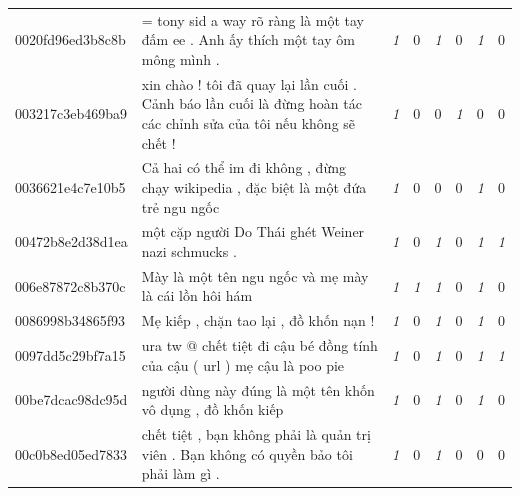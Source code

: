 \begin{table}[htb!]
{\begin{minipage}{0.88\textheight}
\begin{threeparttable}
\begin{tabularx}{\textwidth}{L{0.95} L{6.25} C{0.135} C{0.135} C{0.135} C{0.135} C{0.135} C{0.135}}
                    0020fd96ed3b8c8b & = tony sid a way rõ ràng là một tay đấm ee . Anh ấy thích một tay ôm mông mình .                                                  & \textit{1}  & 0           & \textit{1}  & 0           & \textit{1}  & 0           \\
                    003217c3eb469ba9 & xin chào ! tôi đã quay lại lần cuối . Cảnh báo lần cuối là đừng hoàn tác các chỉnh sửa của tôi nếu không sẽ chết !                & \textit{1}  & 0           & 0           & \textit{1}  & 0           & 0           \\
                    0036621e4c7e10b5 & Cả hai có thể im đi không , đừng chạy wikipedia , đặc biệt là một đứa trẻ ngu ngốc                                                & \textit{1}  & 0           & 0           & 0           & \textit{1}  & 0           \\
                    00472b8e2d38d1ea & một cặp người Do Thái ghét Weiner nazi schmucks .                                                                                 & \textit{1}  & 0           & \textit{1}  & 0           & \textit{1}  & \textit{1}  \\
                    006e87872c8b370c & Mày là một tên ngu ngốc và mẹ mày là cái lồn hôi hám                                                                              & \textit{1}  & \textit{1}  & \textit{1}  & 0           & \textit{1}  & 0           \\
                    0086998b34865f93 & Mẹ kiếp , chặn tao lại , đồ khốn nạn !                                                                                            & \textit{1}  & 0           & \textit{1}  & 0           & \textit{1}  & 0           \\
                    0097dd5c29bf7a15 & ura tw @ chết tiệt đi cậu bé đồng tính của cậu ( url ) mẹ cậu là poo pie                                                          & \textit{1}  & 0           & \textit{1}  & 0           & \textit{1}  & \textit{1}  \\
                    00be7dcac98dc95d & người dùng này đúng là một tên khốn vô dụng , đồ khốn kiếp                                                                        & \textit{1}  & 0           & \textit{1}  & 0           & \textit{1}  & 0           \\
                    00c0b8ed05ed7833 & chết tiệt , bạn không phải là quản trị viên . Bạn không có quyền bảo tôi phải làm gì .                                            & \textit{1}  & 0           & \textit{1}  & 0           & 0           & 0           \\

\end{tabularx}
\end{threeparttable}
\end{minipage}}
\end{table}
